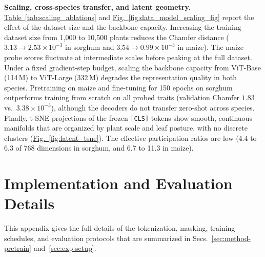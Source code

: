 \documentclass[10pt,twocolumn,letterpaper]{article}
\newcommand{\figref}[1]{\hyperref[#1]{Fig.~\ref*{#1}}}
\newcommand{\tabref}[1]{\hyperref[#1]{Table~\ref*{#1}}}
\begin{document}
\noindent\textbf{Scaling, cross-species transfer, and latent geometry.}
\tabref{tab:scaling_ablations} and \figref{fig:data_model_scaling_fig} report the effect of the dataset size and the backbone capacity. Increasing the training dataset size from 1{,}000 to 10{,}500 plants reduces the Chamfer distance ($3.13 \to 2.53 \times 10^{-3}$ in sorghum and $3.54 \to 0.99 \times 10^{-3}$ in maize). The maize probe scores fluctuate at intermediate scales before peaking at the full dataset. Under a fixed gradient-step budget, scaling the backbone capacity from ViT-Base (114\,M) to ViT-Large (332\,M) degrades the representation quality in both species. Pretraining on maize and fine-tuning for 150 epochs on sorghum outperforms training from scratch on all probed traits (validation Chamfer $1.83$ vs.\ $3.38 \times 10^{-3}$), although the decoders do not transfer zero-shot across species. Finally, t-SNE projections of the frozen \texttt{[CLS]} tokens show smooth, continuous manifolds that are organized by plant scale and leaf posture, with no discrete clusters (\figref{fig:latent_tsne}). The effective participation ratios are low (4.4 to 6.3 of 768 dimensions in sorghum, and 6.7 to 11.3 in maize).

\section{Implementation and Evaluation Details}
\label{app:impl}

This appendix gives the full details of the tokenization, masking, training schedules, and evaluation protocols that are summarized in \textcolor{cvprblue}{Secs.}~\ref{sec:method-pretrain} and~\ref{sec:exp-setup}.
\end{document}
